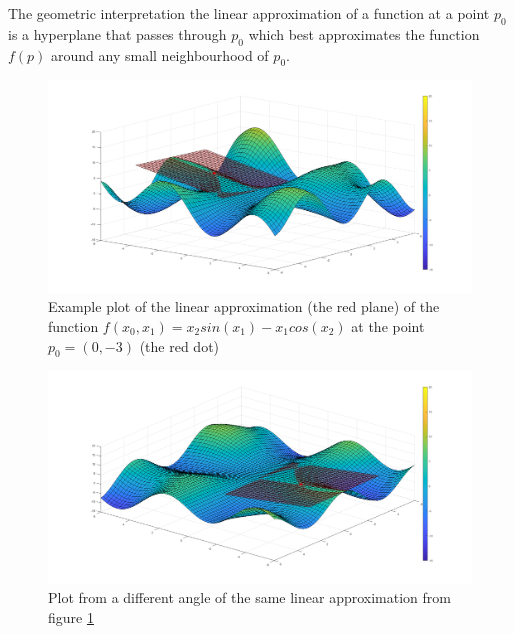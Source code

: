 \noindent The geometric interpretation the linear approximation of a function at a point $p_0$ is a hyperplane that passes through $p_0$ which best approximates the function $f(p)$ around any small neighbourhood of $p_0$.
\begin{figure}[ht]
\centering
\includegraphics[width=13cm]{figures/linear_approx1}
\caption[Linear approximation example 1]{Example plot of the linear approximation (the red plane) of the function $f\left(x_0, x_1\right) = x_2sin\left(x_1\right) - x_1cos\left(x_2\right)$ at the point $p_0 = \left(0, -3\right)$ (the red dot)}
\label{fig:linear_approx1}
\end{figure}
\begin{figure}[ht]
\centering
\includegraphics[width=13cm]{figures/linear_approx2}
\caption[Linear approximation example 2]{Plot from a different angle of the same linear approximation from figure \ref{fig:linear_approx1}}
\label{fig:linear_approx2}
\end{figure}
